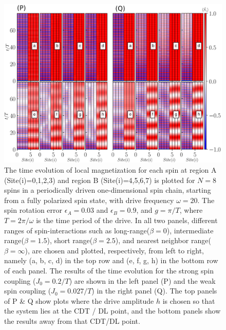 \documentclass[12pt]{iopart}
\begin{document}
\begin{figure}[t!]
    \centering
    \includegraphics[width=13.5cm]{sz_t_strongweakJ_N_8.png}
    \caption{The time evolution of local magnetization for each spin at region A (Site(i)=0,1,2,3) and region B (Site(i)=4,5,6,7) is plotted for $N=8$ spins in a periodically driven one-dimensional spin chain, starting from a fully polarized spin state, with drive frequency $\omega=20$. The spin rotation error $\epsilon_A = 0.03$ and $\epsilon_B = 0.9$, and $g=\pi/T$, where $T=2\pi/\omega$ is the time period of the drive.  In all two panels, different ranges of spin-interactions such as long-range($\beta=0$), intermediate range($\beta=1.5$), short range($\beta=2.5$), and nearest neighbor range($\beta=\infty$), are chosen and plotted, respectively, from left to right, namely (a, b, c, d) in the top row and (e, f, g, h) in the bottom row of each panel. The results of the time evolution for the strong spin coupling ($J_0 = 0.2/T$) are shown in the left panel (P) and the weak spin coupling ($J_0 = 0.027/T$) in the right panel (Q). The top panels of P \& Q show plots where the drive amplitude $h$ is chosen so that the system lies at the CDT / DL point, and the bottom panels show the results away from that CDT/DL point.}
    \label{Fig:strong_weak_ea}
\end{figure}
\end{document}
